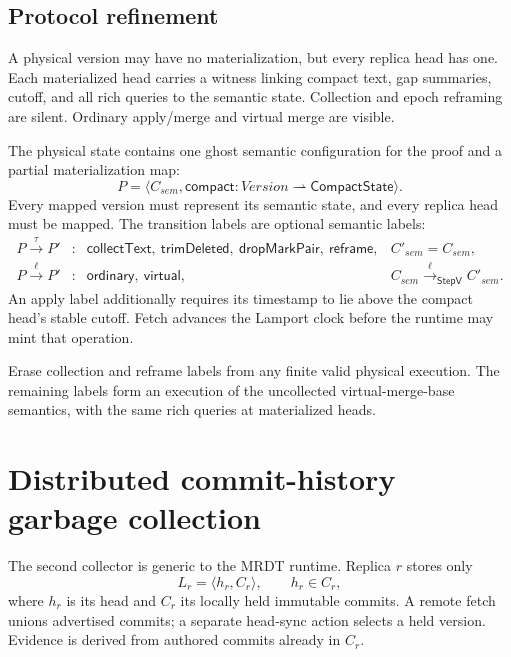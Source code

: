 \subsection{Protocol refinement}

A physical version may have no materialization, but every replica head has
one. Each materialized head carries a  witness linking compact
text, gap summaries, cutoff, and all rich queries to the semantic state.
Collection and epoch reframing are silent. Ordinary apply/merge and virtual
merge are visible.

The physical state contains one ghost semantic configuration for the proof
and a partial materialization map:
\[
 P=\langle C_{sem},\mathsf{compact}:\mathit{Version}\rightharpoonup
 \mathsf{CompactState}\rangle.
\]
Every mapped version must represent its semantic state, and every replica
head must be mapped. The transition labels are optional semantic labels:
\[
\begin{array}{rcll}
 P\xrightarrow{\tau}P' &:& \mathsf{collectText},\ \mathsf{trimDeleted},\
   \mathsf{dropMarkPair},\ \mathsf{reframe},
   &C'_{sem}=C_{sem},\\
 P\xrightarrow{\ell}P' &:& \mathsf{ordinary},\ \mathsf{virtual},
   &C_{sem}\xrightarrow{\ell}_{\mathsf{StepV}}C'_{sem}.
\end{array}
\]
An apply label additionally requires its timestamp to lie above the compact
head's stable cutoff. Fetch advances the Lamport clock before the runtime may
mint that operation.

\begin{theorem}
Erase collection and reframe labels from any finite valid physical execution.
The remaining labels form an execution of the uncollected virtual-merge-base
semantics, with the same rich queries at materialized heads.
\hfill{}
\end{theorem}

\section{Distributed commit-history garbage collection}

The second collector is generic to the MRDT runtime. Replica $r$ stores only
\[
  L_r=\langle h_r,C_r\rangle,\qquad h_r\in C_r,
\]
where $h_r$ is its head and $C_r$ its locally held immutable commits. A remote
fetch unions advertised commits; a separate head-sync action selects a held
version. Evidence is derived from authored commits already in $C_r$.

